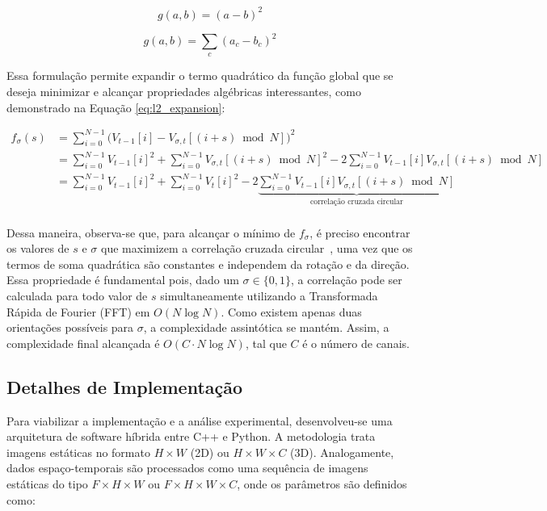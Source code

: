 \documentclass[12pt]{article}
\begin{document}
\begin{equation} \label{eq:l2_cost}
    g(a, b) = (a - b)^2
\end{equation}

\begin{equation} \label{eq:l2_cost_channels}
    g(a, b) = \sum_{c}(a_c - b_c)^2
\end{equation}

Essa formulação permite expandir o termo quadrático da função global que se deseja minimizar e
alcançar propriedades algébricas interessantes, como demonstrado na Equação \ref{eq:l2_expansion}:

\begin{equation} \label{eq:l2_expansion}
\begin{aligned}
    f_\sigma(s) &= \sum_{i=0}^{N-1} \Big(V_{t-1}[i] - V_{\sigma, t}[(i + s) \bmod N]\Big)^2 \\
                &= \sum_{i=0}^{N-1} V_{t-1}[i]^2 + \sum_{i=0}^{N-1} V_{\sigma, t}[(i + s) \bmod N]^2 - 2 \sum_{i=0}^{N-1} V_{t-1}[i] V_{\sigma, t}[(i + s) \bmod N] \\
                &= \sum_{i=0}^{N-1} V_{t-1}[i]^2 + \sum_{i=0}^{N-1} V_{t}[i]^2 - 2 \underbrace{\sum_{i=0}^{N-1} V_{t-1}[i] V_{\sigma, t}[(i + s) \bmod N]}_{\text{correlação cruzada circular}} \\
\end{aligned}
\end{equation}

Dessa maneira, observa-se que, para alcançar o mínimo de $f_\sigma$, é preciso encontrar os valores
de $s$ e $\sigma$ que maximizem a correlação cruzada circular~\cite{wang:19}, uma vez que os termos de soma quadrática 
são constantes e independem da rotação e da direção. Essa propriedade é fundamental pois, dado 
um $\sigma \in \{0, 1\}$, a correlação pode ser calculada para todo valor de $s$ simultaneamente
utilizando a Transformada Rápida de Fourier (FFT) em $O(N \log N)$. Como existem apenas duas
orientações possíveis para $\sigma$, a complexidade assintótica se mantém. Assim, a complexidade
final alcançada é $O(C \cdot N \log N)$, tal que $C$ é o número de canais.

\subsection{Detalhes de Implementação}
Para viabilizar a implementação e a análise experimental, desenvolveu-se uma arquitetura de software
híbrida entre C++ e Python. A metodologia trata imagens estáticas no formato $H \times W$ (2D) ou $H \times W \times C$ (3D).
Analogamente, dados espaço-temporais são processados como uma sequência de imagens estáticas do tipo $F \times H \times W$ ou $F \times H \times W \times C$,
onde os parâmetros são definidos como:
\end{document}
